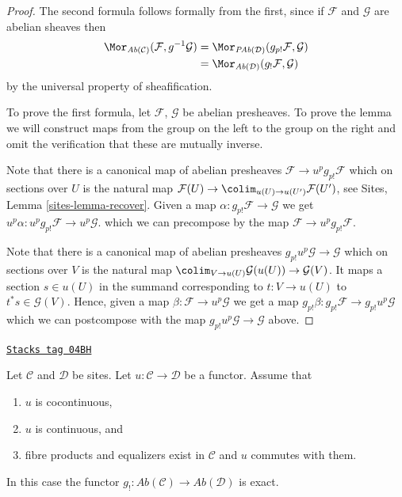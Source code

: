 \begin{proof}
The second formula follows formally from the first, since if
$\mathcal{F}$ and $\mathcal{G}$ are abelian sheaves then
\begin{align*}
\Mor_{\textit{Ab}(\mathcal{C})}(\mathcal{F}, g^{-1}\mathcal{G})
& =
\Mor_{\textit{PAb}(\mathcal{D})}(g_{p!}\mathcal{F}, \mathcal{G}) \\
& =
\Mor_{\textit{Ab}(\mathcal{D})}(g_!\mathcal{F}, \mathcal{G})
\end{align*}
by the universal property of sheafification.

\medskip\noindent
To prove the first formula, let $\mathcal{F}$, $\mathcal{G}$ be abelian
presheaves. To prove the lemma we will construct maps from the group on the
left to the group on the right and omit the verification that these are
mutually inverse.

\medskip\noindent
Note that there is a canonical map of abelian presheaves
$\mathcal{F} \to u^pg_{p!}\mathcal{F}$ which on sections over $U$ is the
natural map
$\mathcal{F}(U) \to \colim_{u(U) \to u(U')} \mathcal{F}(U')$, see
Sites, Lemma \ref{sites-lemma-recover}.
Given a map $\alpha : g_{p!}\mathcal{F} \to \mathcal{G}$
we get $u^p\alpha : u^pg_{p!}\mathcal{F} \to u^p\mathcal{G}$.
which we can precompose by the map $\mathcal{F} \to u^pg_{p!}\mathcal{F}$.

\medskip\noindent
Note that there is a canonical map of abelian presheaves
$g_{p!}u^p\mathcal{G} \to \mathcal{G}$ which on sections over
$V$ is the natural map
$\colim_{V \to u(U)} \mathcal{G}(u(U)) \to \mathcal{G}(V)$.
It maps a section $s \in u(U)$ in the summand corresponding to
$t : V \to u(U)$ to $t^*s \in \mathcal{G}(V)$.
Hence, given a map $\beta : \mathcal{F} \to u^p\mathcal{G}$
we get a map $g_{p!}\beta : g_{p!}\mathcal{F} \to g_{p!}u^p\mathcal{G}$
which we can postcompose with the map $g_{p!}u^p\mathcal{G} \to \mathcal{G}$
above.
\end{proof}

\begin{lemma}
\label{sites-modules-lemma-exactness-lower-shriek}
\href{https://stacks.math.columbia.edu/tag/04BH}{\texttt{Stacks tag 04BH}}

Let $\mathcal{C}$ and $\mathcal{D}$ be sites.
Let $u : \mathcal{C} \to \mathcal{D}$ be a functor.
Assume that
\begin{enumerate}
\item[(a)] $u$ is cocontinuous,
\item[(b)] $u$ is continuous, and
\item[(c)] fibre products and equalizers exist in $\mathcal{C}$ and
$u$ commutes with them.
\end{enumerate}
In this case the functor
$g_! : \textit{Ab}(\mathcal{C}) \to \textit{Ab}(\mathcal{D})$
is exact.
\end{lemma}

